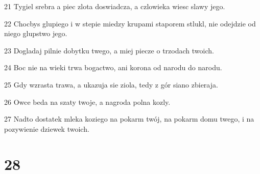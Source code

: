 \par 21 Tygiel srebra a piec zlota doswiadcza, a czlowieka wiesc slawy jego.
\par 22 Chocbys glupiego i w stepie miedzy krupami staporem stlukl, nie odejdzie od niego glupstwo jego.
\par 23 Dogladaj pilnie dobytku twego, a miej piecze o trzodach twoich.
\par 24 Boc nie na wieki trwa bogactwo, ani korona od narodu do narodu.
\par 25 Gdy wzrasta trawa, a ukazuja sie ziola, tedy z gór siano zbieraja.
\par 26 Owce beda na szaty twoje, a nagroda polna kozly.
\par 27 Nadto dostatek mleka koziego na pokarm twój, na pokarm domu twego, i na pozywienie dziewek twoich.

\chapter{28}

